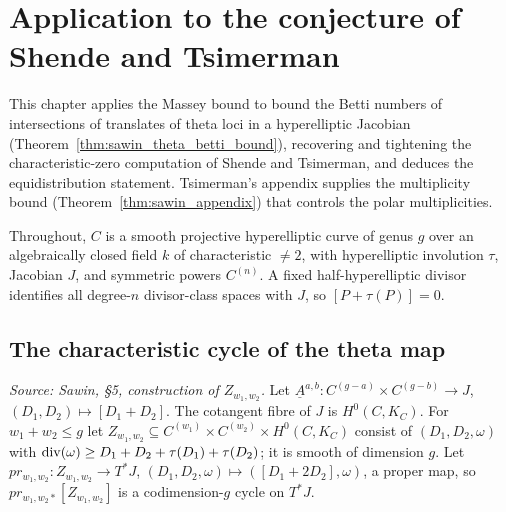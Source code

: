 \section{Application to the conjecture of Shende and Tsimerman}


This chapter applies the Massey bound to bound the Betti numbers of intersections
of translates of theta loci in a hyperelliptic Jacobian
(Theorem~\ref{thm:sawin_theta_betti_bound}), recovering and tightening the
characteristic-zero computation of Shende and Tsimerman, and deduces the
equidistribution statement.  Tsimerman's appendix supplies the multiplicity bound
(Theorem~\ref{thm:sawin_appendix}) that controls the polar multiplicities.

Throughout, $C$ is a smooth projective hyperelliptic curve of genus $g$ over an
algebraically closed field $k$ of characteristic $\ne 2$, with hyperelliptic
involution $\tau$, Jacobian $J$, and symmetric powers $C^{(n)}$.  A fixed
half-hyperelliptic divisor identifies all degree-$n$ divisor-class spaces with
$J$, so $[P+\tau(P)]=0$.

\subsection{The characteristic cycle of the theta map}

\begin{definition}
  \label{def:sawin_Z_locus}
  \textit{Source: Sawin, §5, construction of $Z_{w_1,w_2}$.}
  Let $\underline A^{a,b}:C^{(g-a)}\times C^{(g-b)}\to J$, $(D_1,D_2)\mapsto
  [D_1+D_2]$.  The cotangent fibre of $J$ is $H^0(C,K_C)$.  For $w_1+w_2\le g$ let
  $Z_{w_1,w_2}\subseteq C^{(w_1)}\times C^{(w_2)}\times H^0(C,K_C)$ consist of
  $(D_1,D_2,\omega)$ with $\operatorname{div}(\omega)\ge D_1+D_2+\tau(D_1)+\tau(D_2)$; it is
  smooth of dimension $g$.  Let $pr_{w_1,w_2}:Z_{w_1,w_2}\to T^*J$,
  $(D_1,D_2,\omega)\mapsto([D_1+2D_2],\omega)$, a proper map, so
  $pr_{w_1,w_2*}[Z_{w_1,w_2}]$ is a codimension-$g$ cycle on $T^*J$.
\end{definition}

